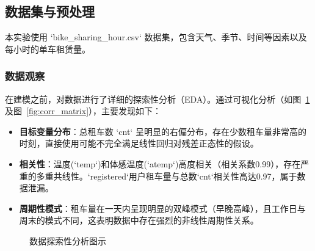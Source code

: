 \documentclass[UTF8,a4paper,10pt]{ctexart}
\begin{document}
\subsection{数据集与预处理}
本实验使用 `bike_sharing_hour.csv` 数据集，包含天气、季节、时间等因素以及每小时的单车租赁量。

\subsubsection{数据观察}
在建模之前，对数据进行了详细的探索性分析（EDA）。通过可视化分析（如图~\ref{fig:eda_plots}及图~\ref{fig:corr_matrix}），主要发现如下：
\begin{itemize}
    \item \textbf{目标变量分布}：总租车数 `cnt` 呈明显的右偏分布，存在少数租车量非常高的时刻，直接使用可能不完全满足线性回归对残差正态性的假设。
    \item \textbf{相关性}：温度(`temp`)和体感温度(`atemp`)高度相关（相关系数0.99），存在严重的多重共线性。`registered`用户租车量与总数`cnt`相关性高达0.97，属于数据泄漏。
    \item \textbf{周期性模式}：租车量在一天内呈现明显的双峰模式（早晚高峰），且工作日与周末的模式不同，这表明数据中存在强烈的非线性周期性关系。
\end{itemize}

\begin{figure}[H]
    \centering
    \hfill
    \caption{数据探索性分析图示}
    \label{fig:eda_plots}
\end{figure}
\end{document}
